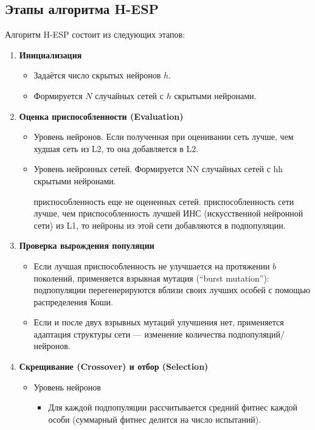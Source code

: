 \documentclass[a4paper,12pt]{article}
\begin{document}
\subsection{Этапы алгоритма H-ESP}
Алгоритм H-ESP состоит из следующих этапов:
\begin{enumerate}
	\item \textbf{Инициализация}
	\begin{itemize}
		\item Задаётся число скрытых нейронов $h$.
		\item Формируется $N$ случайных сетей с $h$ скрытыми нейронами.
	\end{itemize}
	\item \textbf{Оценка приспособленности (Evaluation)}
	\begin{itemize}
		\item Уровень нейронов. Если полученная при оценивании сеть лучше, чем худшая сеть из L2, то она добавляется в L2.
		\item Уровень нейронных сетей. Формируется NN случайных сетей с hh скрытыми нейронами.
    \begin{itemize}
         приспособленность еще не оцененных сетей.
         приспособленность сети лучше, чем приспособленность лучшей ИНС (искусственной нейронной сети) из L1, то нейроны из этой сети добавляются в подпопуляции.
	\end{itemize}
    \end{itemize}
	\item \textbf{Проверка вырождения популяции}
	\begin{itemize}
		\item Если лучшая приспособленность не улучшается на протяжении $b$ поколений, применяется взрывная мутация (``burst mutation''): подпопуляции перегенерируются вблизи своих лучших особей с помощью распределения Коши.
		\item Если и после двух взрывных мутаций улучшения нет, применяется адаптация структуры сети  --- изменение количества подпопуляций/нейронов.
	\end{itemize}
	\item \textbf{Скрещивание (Crossover) и отбор (Selection)}
    \begin{itemize}
    \item Уровень нейронов
	\begin{itemize}
		\item Для каждой подпопуляции рассчитывается средний фитнес каждой особи (суммарный фитнес делится на число испытаний).

\end{itemize}
\end{itemize}
\end{enumerate}
\end{document}
